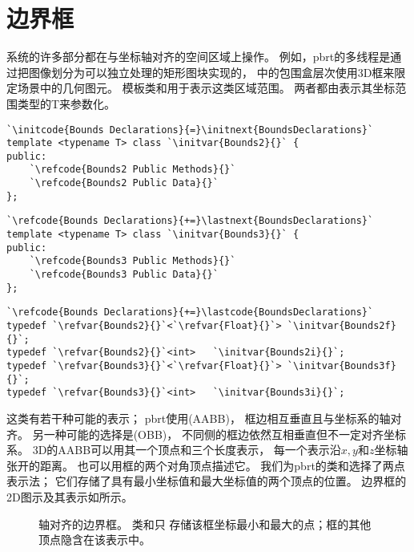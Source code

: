 \section{边界框}\label{sec:边界框}

系统的许多部分都在与坐标轴对齐的空间区域上操作。
例如，pbrt的多线程是通过把图像划分为可以独立处理的矩形图块实现的，
中的包围盒层次使用3D框来限定场景中的几何图元。
模板类和用于表示这类区域范围。
两者都由表示其坐标范围类型的{\ttfamily T}来参数化。
\begin{lstlisting}
`\initcode{Bounds Declarations}{=}\initnext{BoundsDeclarations}`
template <typename T> class `\initvar{Bounds2}{}` {
public:
    `\refcode{Bounds2 Public Methods}{}`
    `\refcode{Bounds2 Public Data}{}`
};
\end{lstlisting}
\begin{lstlisting}
`\refcode{Bounds Declarations}{+=}\lastnext{BoundsDeclarations}`
template <typename T> class `\initvar{Bounds3}{}` {
public:
    `\refcode{Bounds3 Public Methods}{}`
    `\refcode{Bounds3 Public Data}{}`
};
\end{lstlisting}
\begin{lstlisting}
`\refcode{Bounds Declarations}{+=}\lastcode{BoundsDeclarations}`
typedef `\refvar{Bounds2}{}`<`\refvar{Float}{}`> `\initvar{Bounds2f}{}`;
typedef `\refvar{Bounds2}{}`<int>   `\initvar{Bounds2i}{}`;
typedef `\refvar{Bounds3}{}`<`\refvar{Float}{}`> `\initvar{Bounds3f}{}`;
typedef `\refvar{Bounds3}{}`<int>   `\initvar{Bounds3i}{}`;
\end{lstlisting}

这类有若干种可能的表示；
pbrt使用(AABB)，
框边相互垂直且与坐标系的轴对齐。
另一种可能的选择是(OBB)，
不同侧的框边依然互相垂直但不一定对齐坐标系。
3D的AABB可以用其一个顶点和三个长度表示，
每一个表示沿$x,y$和$z$坐标轴张开的距离。
也可以用框的两个对角顶点描述它。
我们为pbrt的类和选择了两点表示法；
它们存储了具有最小坐标值和最大坐标值的两个顶点的位置。
边界框的2D图示及其表示如所示。
\begin{figure}[htbp]
    \centering
    \caption{轴对齐的边界框。
        类\protect{}和\protect{}只
        存储该框坐标最小和最大的点；框的其他顶点隐含在该表示中。}
    \label{fig:2.8}
\end{figure}

